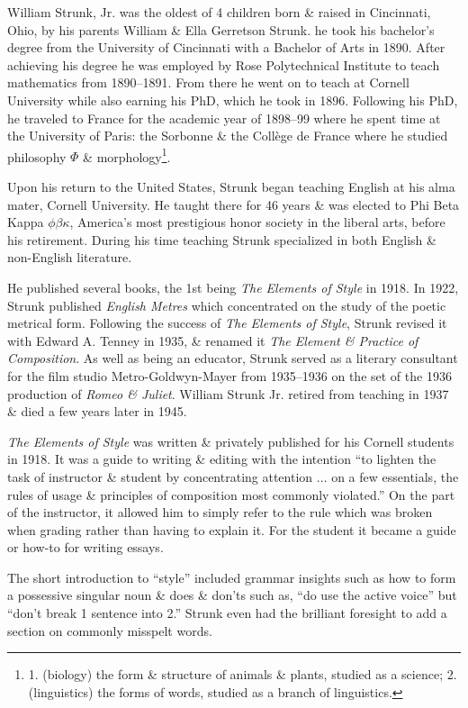 \documentclass{article}
\begin{document}
William Strunk, Jr. was the oldest of 4 children born \& raised in Cincinnati, Ohio, by his parents William \& Ella Gerretson Strunk. he took his bachelor's degree from the University of Cincinnati with a Bachelor of Arts in 1890. After achieving his degree he was employed by Rose Polytechnical Institute to teach mathematics from 1890--1891. From there he went on to teach at Cornell University while also earning his PhD, which he took in 1896. Following his PhD, he traveled to France for the academic year of 1898--99 where he spent time at the University of Paris: the Sorbonne \& the Coll\`ege de France where he studied philosophy $\Phi$ \& morphology\footnote{1. (biology) the form \& structure of animals \& plants, studied as a science; 2. (linguistics) the forms of words, studied as a branch of linguistics.}.

Upon his return to the United States, Strunk began teaching English at his alma mater, Cornell University. He taught there for 46 years \& was elected to Phi Beta Kappa $\phi\beta\kappa$, America's most prestigious honor society in the liberal arts, before his retirement. During his time teaching Strunk specialized in both English \& non-English literature.

He published several books, the 1st being {\it The Elements of Style} in 1918. In 1922, Strunk published {\it English Metres} which concentrated on the study of the poetic metrical form. Following the success of {\it The Elements of Style}, Strunk revised it with Edward A. Tenney in 1935, \& renamed it {\it The Element \& Practice of Composition}. As well as being an educator, Strunk served as a literary consultant for the film studio Metro-Goldwyn-Mayer from 1935--1936 on the set of the 1936 production of {\it Romeo \& Juliet}. William Strunk Jr. retired from teaching in 1937 \& died a few years later in 1945.

{\it The Elements of Style} was written \& privately published for his Cornell students in 1918. It was a guide to writing \& editing with the intention ``to lighten the task of instructor \& student by concentrating attention $\ldots$ on a few essentials, the rules of usage \& principles of composition most commonly violated.'' On the part of the instructor, it allowed him to simply refer to the rule which was broken when grading rather than having to explain it. For the student it became a guide or how-to for writing essays.

The short introduction to ``style'' included grammar insights such as how to form a possessive singular noun \& does \& don'ts such as, ``do use the active voice'' but ``don't break 1 sentence into 2.'' Strunk even had the brilliant foresight to add a section on commonly misspelt words.
\end{document}
